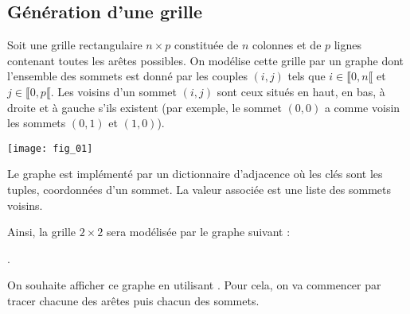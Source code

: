 %
\setcounter{numques}{0}


\subsection*{Génération d'une grille}

Soit une grille rectangulaire $n\times p$ constituée de $n$ colonnes et de $p$ lignes contenant toutes les arêtes possibles. On modélise cette grille par un graphe dont l'ensemble des sommets est donné par les couples $(i,j)$ tels que $i\in\llbracket 0,n \llbracket $ et $j\in\llbracket 0,p \llbracket $. Les voisins d'un sommet $(i,j)$ sont ceux situés en haut, en bas, à droite et à gauche s'ils existent (par exemple, le sommet $(0,0)$ a comme voisin les sommets $(0,1)$ et $(1,0)$).



\begin{center}
\texttt{[image: fig\_01]}
\end{center}

Le graphe est implémenté par un dictionnaire d'adjacence où les clés sont les tuples, coordonnées d'un sommet. La valeur associée est une liste des sommets voisins. 


Ainsi, la grille $ 2 \times 2$ sera modélisée par le graphe suivant :

\noindent{}.


On souhaite afficher ce graphe en utilisant . Pour cela, on va commencer par tracer chacune des arêtes puis chacun des sommets. 



